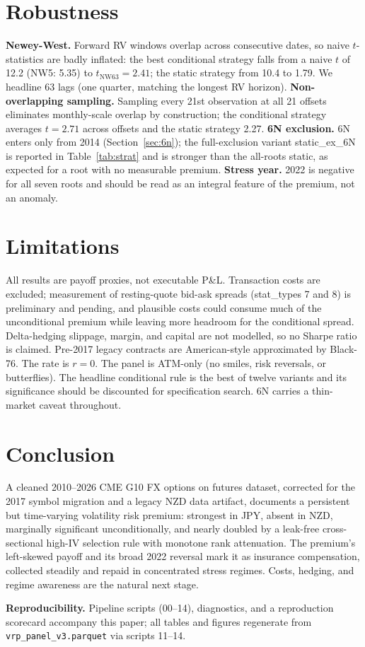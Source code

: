 \documentclass[10pt,twocolumn]{article}
\begin{document}
\section{Robustness}
\textbf{Newey-West.} Forward RV windows overlap across consecutive dates, so naive $t$-statistics are badly inflated: the best conditional strategy falls from a naive $t$ of 12.2 (NW5: 5.35) to $t_{\mathrm{NW63}}=2.41$; the static strategy from 10.4 to 1.79. We headline 63 lags (one quarter, matching the longest RV horizon).
\textbf{Non-overlapping sampling.} Sampling every 21st observation at all 21 offsets eliminates monthly-scale overlap by construction; the conditional strategy averages $t=2.71$ across offsets and the static strategy 2.27.
\textbf{6N exclusion.} 6N enters only from 2014 (Section~\ref{sec:6n}); the full-exclusion variant static\_ex\_6N is reported in Table~\ref{tab:strat} and is stronger than the all-roots static, as expected for a root with no measurable premium.
\textbf{Stress year.} 2022 is negative for all seven roots and should be read as an integral feature of the premium, not an anomaly.

\section{Limitations}
All results are payoff proxies, not executable P\&L. Transaction costs are excluded; measurement of resting-quote bid-ask spreads (stat\_types 7 and 8) is preliminary and pending, and plausible costs could consume much of the unconditional premium while leaving more headroom for the conditional spread. Delta-hedging slippage, margin, and capital are not modelled, so no Sharpe ratio is claimed. Pre-2017 legacy contracts are American-style approximated by Black-76. The rate is $r=0$. The panel is ATM-only (no smiles, risk reversals, or butterflies). The headline conditional rule is the best of twelve variants and its significance should be discounted for specification search. 6N carries a thin-market caveat throughout.

\section{Conclusion}
A cleaned 2010--2026 CME G10 FX options on futures dataset, corrected for the 2017 symbol migration and a legacy NZD data artifact, documents a persistent but time-varying volatility risk premium: strongest in JPY, absent in NZD, marginally significant unconditionally, and nearly doubled by a leak-free cross-sectional high-IV selection rule with monotone rank attenuation. The premium's left-skewed payoff and its broad 2022 reversal mark it as insurance compensation, collected steadily and repaid in concentrated stress regimes. Costs, hedging, and regime awareness are the natural next stage.

\vspace{2mm}
\noindent\textbf{Reproducibility.} Pipeline scripts (00--14), diagnostics, and a reproduction scorecard accompany this paper; all tables and figures regenerate from \texttt{vrp\_panel\_v3.parquet} via scripts 11--14.
\end{document}
